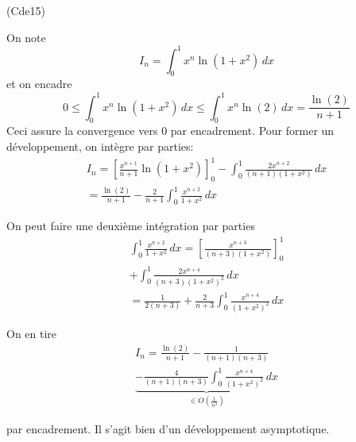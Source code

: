 \begin{tiny}(Cde15)\end{tiny} On note 
\begin{displaymath}
  I_n = \int_{0}^{1}x^n \ln(1+x^2)\,dx
\end{displaymath}
et on encadre 
\begin{displaymath}
  0\leq \int_{0}^{1}x^n \ln(1+x^2)\,dx \leq \int_{0}^{1}x^n \ln(2)\,dx = \frac{\ln(2)}{n+1}
\end{displaymath}
Ceci assure la convergence vers $0$ par encadrement. Pour former un développement, on intègre par parties:
\begin{multline*}
I_n = \left[ \frac{x^{n+1}}{n+1}\ln(1+x^2)\right]_{0}^{1}- \int_{0}^{1} \frac{2x^{n+2}}{(n+1)(1+x^2)}\,dx\\
= \frac{\ln(2)}{n+1} - \frac{2}{n+1} \int_{0}^{1}\frac{x^{n+2}}{1+x^2}\,dx
\end{multline*}

On peut faire une deuxième intégration par parties
\begin{multline*}
\int_{0}^{1}\frac{x^{n+2}}{1+x^2}\,dx
= \left[ \frac{x^{n+3}}{(n+3)(1+x^2)}\right]_{0}^{1} \\
+ \int_{0}^{1}\frac{2x^{n+4}}{(n+3)(1+x^2)^2}\,dx \\
= \frac{1}{2(n+3)}+\frac{2}{n+3}\int_{0}^{1}\frac{x^{n+4}}{(1+x^2)^2}\,dx
\end{multline*}

On en tire
\begin{multline*}
  I_n = \frac{\ln(2)}{n+1} -  \frac{1}{(n+1)(n+3)}\\ 
  \underset{\in O(\frac{1}{n^3})}{\underbrace{-\frac{4}{(n+1)(n+3)}\int_{0}^{1}\frac{x^{n+4}}{(1+x^2)^2}\,dx}}
\end{multline*}

par encadrement. Il s'agit bien d'un développement asymptotique.
